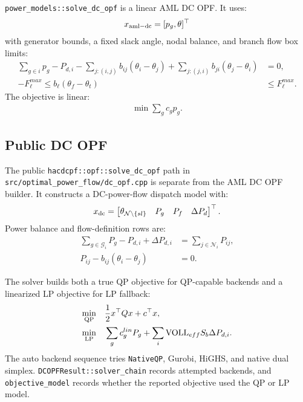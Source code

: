 \texttt{power\_models::solve\_dc\_opf} is a linear AML DC OPF.  It uses:
\begin{align}
x_{\mathrm{aml-dc}}=[p_g,\theta]^{\top}
\end{align}
with generator bounds, a fixed slack angle, nodal balance, and branch flow box
limits:
\begin{align}
\sum_{g\in i}p_g-P_{d,i}
-\sum_{j:(i,j)}b_{ij}(\theta_i-\theta_j)
+\sum_{j:(j,i)}b_{ji}(\theta_j-\theta_i)&=0,\\
-F_{\ell}^{max}\le b_{\ell}(\theta_f-\theta_t)&\le F_{\ell}^{max}.
\end{align}
The objective is linear:
\begin{align}
\min\sum_g c_g p_g.
\end{align}

\subsection{Public DC OPF}
\label{sec:dc-opf}

The public \texttt{hacdcpf::opf::solve\_dc\_opf} path in
\texttt{src/optimal\_power\_flow/dc\_opf.cpp} is separate from the AML DC OPF
builder.  It constructs a DC-power-flow dispatch model with:
\begin{align}
x_{\mathrm{dc}}=
\begin{bmatrix}
\theta_{\mathcal{N}\setminus\{sl\}}&
P_g&
P_f&
\Delta P_d
\end{bmatrix}^{\top}.
\end{align}
Power balance and flow-definition rows are:
\begin{align}
\sum_{g\in\mathcal{G}_i}P_g-P_{d,i}+\Delta P_{d,i}
&=\sum_{j\in\mathcal{N}_i}P_{ij},\\
P_{ij}-b_{ij}(\theta_i-\theta_j)&=0.
\end{align}

The solver builds both a true QP objective for QP-capable backends and a
linearized LP objective for LP fallback:
\begin{align}
\min_{\mathrm{QP}}\quad&\frac{1}{2}x^{\top}Qx+c^{\top}x,\\
\min_{\mathrm{LP}}\quad&
\sum_g c_g^{lin}P_g+\sum_i\mathrm{VOLL}_{eff}S_b\Delta P_{d,i}.
\end{align}
The auto backend sequence tries \texttt{NativeQP}, Gurobi, HiGHS, and native
dual simplex.  \texttt{DCOPFResult::solver\_chain} records attempted backends,
and \texttt{objective\_model} records whether the reported objective used the
QP or LP model.

